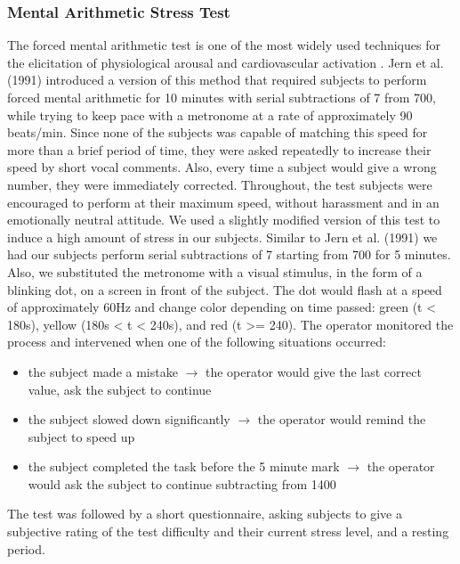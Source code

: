 \subsubsection{Mental Arithmetic Stress Test}\label{ast}
The forced mental arithmetic test is one of the most widely used techniques for the elicitation of physiological arousal and cardiovascular activation \cite{Jern1991}. Jern et al. (1991) introduced a version of this method that required subjects to perform forced mental arithmetic for 10 minutes with serial subtractions of 7 from 700, while trying to keep pace with a metronome at a rate of approximately 90 beats/min. Since none of the subjects was capable of matching this speed for more than a brief period of time, they were asked repeatedly to increase their speed by short vocal comments. Also, every time a subject would give a wrong number, they were immediately corrected. Throughout, the test subjects were encouraged to perform at their maximum speed, without harassment and in an emotionally neutral attitude.
We used a slightly modified version of this test to induce a high amount of stress in our subjects. Similar to Jern et al. (1991) we had our subjects perform serial subtractions of 7 starting from 700 for 5 minutes. Also, we substituted the metronome with a visual stimulus, in the form of a blinking dot, on a screen in front of the subject. The dot would flash at a speed of approximately 60Hz and change color depending on time passed: green (t < 180s), yellow (180s < t < 240s), and red (t >= 240).
The operator monitored the process and intervened when one of the following situations occurred:
\begin{itemize}
\item the subject made a mistake $\rightarrow$ the operator would give the last correct value, ask the subject to continue
\item the subject slowed down significantly $\rightarrow$ the operator would remind the subject to speed up
\item the subject completed the task before the 5 minute mark $\rightarrow$ the operator would ask the subject to continue subtracting from 1400
\end{itemize} 
The test was followed by a short questionnaire, asking subjects to give a subjective rating of the test difficulty and their current stress level, and a resting period.

